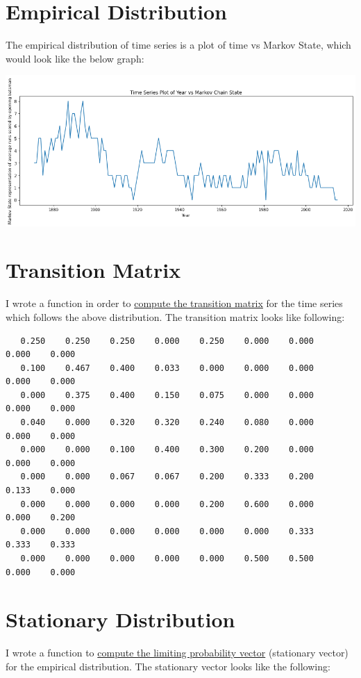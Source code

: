 \documentclass[a4paper, article, oneside, UKenglish]{memoir}
\newcommand{\0}{\mathbf{0}}
\newcommand{\1}{\mathbf{1}}
\begin{document}
\section{Empirical Distribution}
The empirical distribution of time series is a plot of time vs Markov State, which would look like the below graph:

\centerline{\includegraphics[scale=0.5]{projectfp-images/YearVsMarkovStateOriginal.png}}

\section{Transition Matrix}
I wrote a function in order to \hyperref[sec:tm]{compute the transition matrix} for the time series which follows the above distribution. The transition matrix looks like following:

\begin{verbatim}
   0.250    0.250    0.250    0.000    0.250    0.000    0.000    0.000    0.000 
   0.100    0.467    0.400    0.033    0.000    0.000    0.000    0.000    0.000 
   0.000    0.375    0.400    0.150    0.075    0.000    0.000    0.000    0.000 
   0.040    0.000    0.320    0.320    0.240    0.080    0.000    0.000    0.000 
   0.000    0.000    0.100    0.400    0.300    0.200    0.000    0.000    0.000 
   0.000    0.000    0.067    0.067    0.200    0.333    0.200    0.133    0.000 
   0.000    0.000    0.000    0.000    0.200    0.600    0.000    0.000    0.200 
   0.000    0.000    0.000    0.000    0.000    0.000    0.333    0.333    0.333 
   0.000    0.000    0.000    0.000    0.000    0.500    0.500    0.000    0.000
\end{verbatim}

\section{Stationary Distribution}
I wrote a function to \hyperref[sec:sv]{compute the limiting probability vector} (stationary vector) for the empirical distribution. The stationary vector looks like the following:
\end{document}

